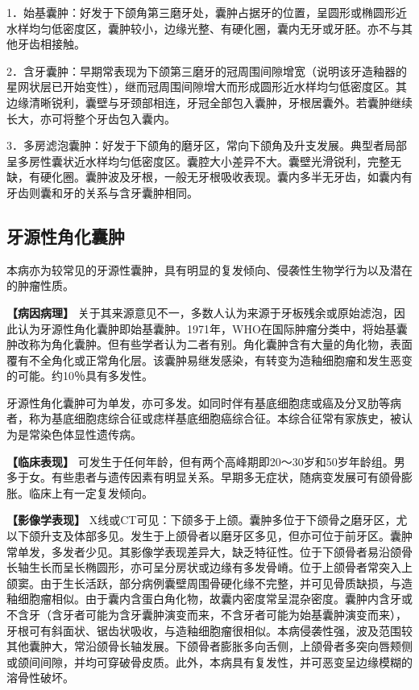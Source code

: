1．始基囊肿：好发于下颌角第三磨牙处，囊肿占据牙的位置，呈圆形或椭圆形近水样均匀低密度区，囊肿较小，边缘光整、有硬化圈，囊内无牙或牙胚。亦不与其他牙齿相接触。

2．含牙囊肿：早期常表现为下颌第三磨牙的冠周围间隙增宽（说明该牙造釉器的星网状层已开始变性），继而冠周围间隙增大而形成圆形近水样均匀低密度区。其边缘清晰锐利，囊壁与牙颈部相连，牙冠全部包入囊肿，牙根居囊外。若囊肿继续长大，亦可将整个牙齿包入囊内。

3．多房滤泡囊肿：好发于下颌角的磨牙区，常向下颌角及升支发展。典型者局部呈多房性囊状近水样均匀低密度区。囊腔大小差异不大。囊壁光滑锐利，完整无缺，有硬化圈。囊肿波及牙根，一般无牙根吸收表现。囊内多半无牙齿，如囊内有牙齿则囊和牙的关系与含牙囊肿相同。

\subsection{牙源性角化囊肿}

本病亦为较常见的牙源性囊肿，具有明显的复发倾向、侵袭性生物学行为以及潜在的肿瘤性质。

\textbf{【病因病理】}
关于其来源意见不一，多数人认为来源于牙板残余或原始滤泡，因此认为牙源性角化囊肿即始基囊肿。1971年，WHO在国际肿瘤分类中，将始基囊肿改称为角化囊肿。但有些学者认为二者有别。角化囊肿含有大量的角化物，表面覆有不全角化或正常角化层。该囊肿易继发感染，有转变为造釉细胞瘤和发生恶变的可能。约10％具有多发性。

牙源性角化囊肿可为单发，亦可多发。如同时伴有基底细胞痣或癌及分叉肋等病者，称为基底细胞痣综合征或痣样基底细胞癌综合征。本综合征常有家族史，被认为是常染色体显性遗传病。

\textbf{【临床表现】}
可发生于任何年龄，但有两个高峰期即20～30岁和50岁年龄组。男多于女。有些患者与遗传因素有明显关系。早期多无症状，随病变发展可有颌骨膨胀。临床上有一定复发倾向。

\textbf{【影像学表现】}
X线或CT可见：下颌多于上颌。囊肿多位于下颌骨之磨牙区，尤以下颌升支及体部多见。发生于上颌骨者以磨牙区多见，但亦可位于前牙区。囊肿常单发，多发者少见。其影像学表现差异大，缺乏特征性。位于下颌骨者易沿颌骨长轴生长而呈长椭圆形，亦可呈分房状或边缘有多发骨嵴。位于上颌骨者常突入上颌窦。由于生长活跃，部分病例囊壁周围骨硬化缘不完整，并可见骨质缺损，与造釉细胞瘤相似。由于囊内含蛋白角化物，故囊内密度常呈混杂密度。囊肿内含牙或不含牙（含牙者可能为含牙囊肿演变而来，不含牙者可能为始基囊肿演变而来），牙根可有斜面状、锯齿状吸收，与造釉细胞瘤很相似。本病侵袭性强，波及范围较其他囊肿大，常沿颌骨长轴发展。下颌骨者膨胀多向舌侧，上颌骨者多突向唇颊侧或颌间间隙，并均可穿破骨皮质。此外，本病具有复发性，并可恶变呈边缘模糊的溶骨性破坏。

